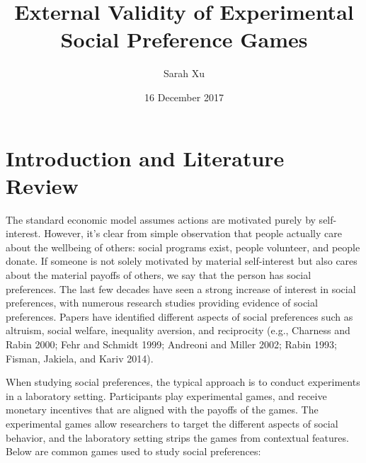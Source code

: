 \documentclass{article}
\title{External Validity of Experimental Social Preference Games}
\author{Sarah Xu}
\date{16 December 2017}
\begin{document}
\maketitle

\section{Introduction and Literature Review}

The standard economic model assumes actions are motivated purely by self-interest. However, it\rq s clear from simple observation that people actually care about the wellbeing of others: social programs exist, people volunteer, and people donate. If someone is not solely motivated by material self-interest but also cares about the material payoffs of others, we say that the person has social preferences. The last few decades have seen a strong increase of interest in social preferences, with numerous research studies providing evidence of social preferences. Papers have identified different aspects of social preferences such as altruism, social welfare, inequality aversion, and reciprocity (e.g., Charness and Rabin 2000; Fehr and Schmidt 1999; Andreoni and Miller 2002; Rabin 1993; Fisman, Jakiela, and Kariv 2014). 
 
When studying social preferences, the typical approach is to conduct experiments in a laboratory setting. Participants play experimental games, and receive monetary incentives that are aligned with the payoffs of the games. The experimental games allow researchers to target the different aspects of social behavior, and the laboratory setting strips the games from contextual features. Below are common games used to study social preferences: 
\end{document}
